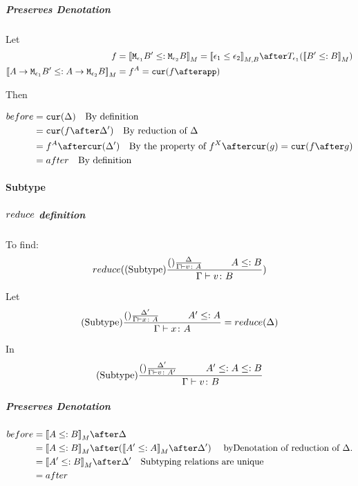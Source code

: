 {            \subparagraph{Preserves Denotation}
                Let
                \begin{align}
                    f &= \deno{\M{\e_1}{B'}\subtype\M{\e_2}{B}} = \db{\e_1\subeffect\e_2}_{M, B}\after\T{\e_1}{(\deno{B'\subtype B})} \\
                    \deno{\lamtype{A}{\e_1}{B'}\subtype\lamtype{A}{\e_2}{B}} & = f^A = \cur{f\after \app}
                \end{align}

                Then

                \begin{align}
                    before & = \cur{\D} \qt{By definition}\\
                            & = \cur{f\after\D'} \qt{By reduction of $\D$} \\
                            & = f^A\after\cur{\D'}\qt{By the property of $f^X\after\cur{g} = \cur{f\after g}$} \\
                            & = after \qt{By definition}\\
                \end{align}

            \paragraph{Subtype}
            \subparagraph{$reduce$ definition}
            To find:
            \begin{equation}
                \reduce(\treerule{Subtype}{\treerule{}{\D}{\gtyperelation{v}{A}}\s\s A \subtype B}{\gtyperelation{v}{B}})
            \end{equation}

            Let 
            \begin{equation}\label{SubtypeDeltaReduction}
                \treerule{Subtype}{\treerule{}{\D'}{\gtyperelation{x}{A}}\s\s A'\subtype A}{\gtyperelation{x}{A}} = \reduce(\D)
            \end{equation}

            In 
            \begin{equation}
                \treerule{Subtype}{
                    \treerule{}{\D'}{\gtyperelation{v}{A'}}
                \s\s
                A' \subtype A \subtype B
                }{\gtyperelation{v}{B}}
            \end{equation}

            \subparagraph{Preserves Denotation}
                \begin{align}
                    before & = \deno{A \subtype B} \after \D \\
                    & = \deno{A \subtype B} \after (\deno{A' \subtype A} \after \D') \qt{ byDenotation of reduction of $\D$.}\\
                    & = \deno{A' \subtype B} \after \D'\qt{Subtyping relations are unique} \\
                    & = after \\
                \end{align}
}
